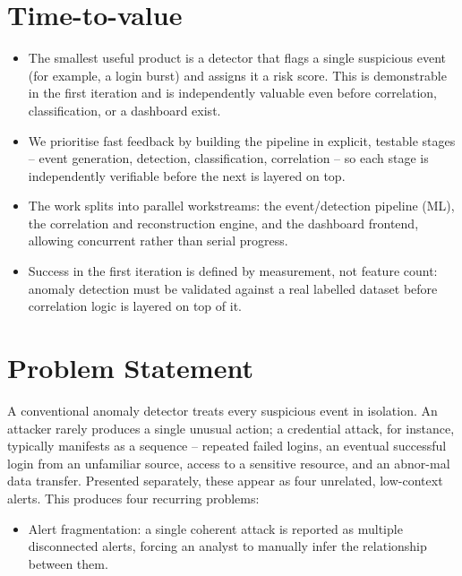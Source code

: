 \documentclass[12pt]{article}
\begin{document}
\section{Time-to-value}

\begin{itemize}
  \item The smallest useful product is a detector that flags a single suspicious event (for example, a login burst) and assigns it a risk score. This is demonstrable in the first iteration and is independently valuable even before correlation, classification, or a dashboard exist.
  \item We prioritise fast feedback by building the pipeline in explicit, testable stages -- event generation, detection, classification, correlation -- so each stage is independently verifiable before the next is layered on top.
  \item The work splits into parallel workstreams: the event/detection pipeline (ML), the correlation and reconstruction engine, and the dashboard frontend, allowing concurrent rather than serial progress.
  \item Success in the first iteration is defined by measurement, not feature count: anomaly detection must be validated against a real labelled dataset before correlation logic is layered on top of it.
\end{itemize}

\section{Problem Statement}

A conventional anomaly detector treats every suspicious event in isolation. An attacker rarely produces a single unusual action; a credential attack, for instance, typically manifests as a sequence -- repeated failed logins, an eventual successful login from an unfamiliar source, access to a sensitive resource, and an abnor-mal data transfer. Presented separately, these appear as four unrelated, low-context alerts. This produces four recurring problems:

\begin{itemize}
  \item Alert fragmentation: a single coherent attack is reported as multiple disconnected alerts, forcing an analyst to manually infer the relationship between them.
\end{itemize}
\end{document}
